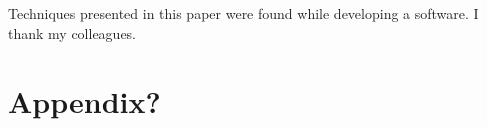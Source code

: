\documentclass[acmsmall]{acmart}
\begin{document}





\begin{acks}
Techniques presented in this paper were found while developing a software.
I thank my colleagues.
\end{acks}




\appendix

\section{Appendix?}
\end{document}
